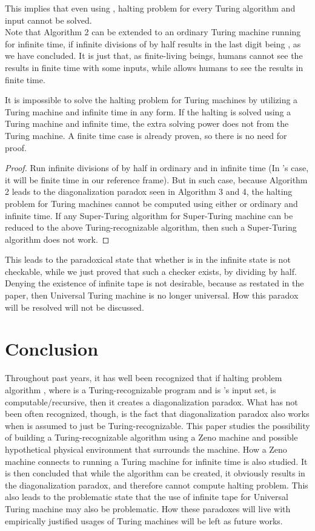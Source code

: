 \documentclass{roffin}
\begin{document}
This implies that even using , halting problem for every Turing algorithm and input cannot be solved.\\
Note that Algorithm 2 can be extended to an ordinary Turing machine running for infinite time, if infinite divisions of  by half results in the last digit being , as we have concluded. It is just that, as finite-living beings, humans cannot see the results in finite time with some inputs, while  allows humans to see the results in finite time. 
\begin{proposition}
It is impossible to solve the halting problem for Turing machines by utilizing a Turing machine and infinite time in any form. If the halting is solved using a Turing machine and infinite time, the extra solving power does not from the Turing machine. A finite time case is already proven, so there is no need for proof.
\end{proposition}
\begin{proof}
Run infinite divisions of  by half in ordinary  and  in infinite time (In 's case, it will be finite time in our reference frame). But in such case, because Algorithm 2 leads to the diagonalization paradox seen in Algorithm 3 and 4, the halting problem for Turing machines cannot be computed using either  or ordinary  and infinite time. If any Super-Turing algorithm for Super-Turing machine can be reduced to the above Turing-recognizable algorithm, then such a Super-Turing algorithm does not work.   
\end{proof}
This leads to the paradoxical state that whether  is in the infinite state is not checkable, while we just proved that such a checker exists, by dividing  by half. Denying the existence of infinite tape is not desirable, because as restated in the paper, then Universal Turing machine is no longer universal. How this paradox will be resolved will not be discussed.
\section{Conclusion}
Throughout past years, it has well been recognized that if halting problem algorithm , where  is a Turing-recognizable program and  is 's input set, is computable/recursive, then it creates a diagonalization paradox. What has not been often recognized, though, is the fact that diagonalization paradox also works when  is assumed to just be Turing-recognizable. This paper studies the possibility of building a Turing-recognizable algorithm using a Zeno machine and possible hypothetical physical environment that surrounds the machine. How a Zeno machine connects to running a Turing machine for infinite time is also studied. It is then concluded that while the algorithm can be created, it obviously results in the diagonalization paradox, and therefore cannot compute halting problem. This also leads to the problematic state that the use of infinite tape for Universal Turing machine may also be problematic. How these paradoxes will live with empirically justified usages of Turing machines will be left as future works.
\end{document}
